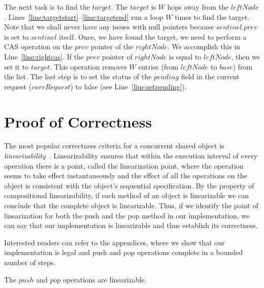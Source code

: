 \documentclass{llncs}
\begin{document}
The next task is to find the $target$. The $target$ is $W$ hops away from the $leftNode$.
Lines~\ref{line:targetstart}--\ref{line:targetend} run a loop $W$ times to find the target. Note that we shall never
have any issues with null pointers because $sentinel.prev$ is set to $sentinel$ itself. Once, we have found the
target, we need to perform a CAS operation on the $prev$ pointer of the $rightNode$. We accomplish this in
Line~\ref{line:rightcas}. If the $prev$ pointer of $rightNode$ is equal to $leftNode$, then we set it to $target$.
This operation removes $W$ entries (from $leftNode$ to $base$) from the list. The last step is to set the 
status of the $pending$ field in the current request ($currRequest$) to false (see Line~\ref{line:setpending}).




\section{Proof of Correctness}
\vspace{-3mm}
The most popular correctness criteria for a concurrent shared object is {\em
linearizability}~\cite{linearizability}. Linearizability ensures that within the execution interval of every operation
there is a point, called the linearization point, where the operation seems to
take effect instantaneously and the effect of all the operations on the object
is consistent with the object's sequential specification. 
By the property of compositional linearizability, if each method of an object is linearizable we can 
conclude that the complete object is linearizable.
Thus, if we identify the point of linearization for both the push and the pop method in our implementation, 
we can say that our implementation is linearizable and thus establish its correctness.

Interested readers can refer to the appendices, where we show that our 
implementation is legal and push and pop operations complete in a bounded number of steps.


\begin{theorem}
The $push$ and $pop$ operations are linearizable.
\end{theorem}
\end{document}
